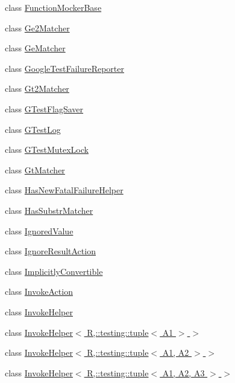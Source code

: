 \begin{DoxyCompactItemize}
\item 
class \hyperlink{classtesting_1_1internal_1_1_function_mocker_base}{Function\+Mocker\+Base}
\item 
class \hyperlink{classtesting_1_1internal_1_1_ge2_matcher}{Ge2\+Matcher}
\item 
class \hyperlink{classtesting_1_1internal_1_1_ge_matcher}{Ge\+Matcher}
\item 
class \hyperlink{classtesting_1_1internal_1_1_google_test_failure_reporter}{Google\+Test\+Failure\+Reporter}
\item 
class \hyperlink{classtesting_1_1internal_1_1_gt2_matcher}{Gt2\+Matcher}
\item 
class \hyperlink{classtesting_1_1internal_1_1_g_test_flag_saver}{G\+Test\+Flag\+Saver}
\item 
class \hyperlink{classtesting_1_1internal_1_1_g_test_log}{G\+Test\+Log}
\item 
class \hyperlink{classtesting_1_1internal_1_1_g_test_mutex_lock}{G\+Test\+Mutex\+Lock}
\item 
class \hyperlink{classtesting_1_1internal_1_1_gt_matcher}{Gt\+Matcher}
\item 
class \hyperlink{classtesting_1_1internal_1_1_has_new_fatal_failure_helper}{Has\+New\+Fatal\+Failure\+Helper}
\item 
class \hyperlink{classtesting_1_1internal_1_1_has_substr_matcher}{Has\+Substr\+Matcher}
\item 
class \hyperlink{classtesting_1_1internal_1_1_ignored_value}{Ignored\+Value}
\item 
class \hyperlink{classtesting_1_1internal_1_1_ignore_result_action}{Ignore\+Result\+Action}
\item 
class \hyperlink{classtesting_1_1internal_1_1_implicitly_convertible}{Implicitly\+Convertible}
\item 
class \hyperlink{classtesting_1_1internal_1_1_invoke_action}{Invoke\+Action}
\item 
class \hyperlink{classtesting_1_1internal_1_1_invoke_helper}{Invoke\+Helper}
\item 
class \hyperlink{classtesting_1_1internal_1_1_invoke_helper_3_01_r_00_1_1testing_1_1tuple_3_01_a1_01_4_01_4}{Invoke\+Helper$<$ R,\+::testing\+::tuple$<$ A1 $>$ $>$}
\item 
class \hyperlink{classtesting_1_1internal_1_1_invoke_helper_3_01_r_00_1_1testing_1_1tuple_3_01_a1_00_01_a2_01_4_01_4}{Invoke\+Helper$<$ R,\+::testing\+::tuple$<$ A1, A2 $>$ $>$}
\item 
class \hyperlink{classtesting_1_1internal_1_1_invoke_helper_3_01_r_00_1_1testing_1_1tuple_3_01_a1_00_01_a2_00_01_a3_01_4_01_4}{Invoke\+Helper$<$ R,\+::testing\+::tuple$<$ A1, A2, A3 $>$ $>$}

\end{DoxyCompactItemize}
